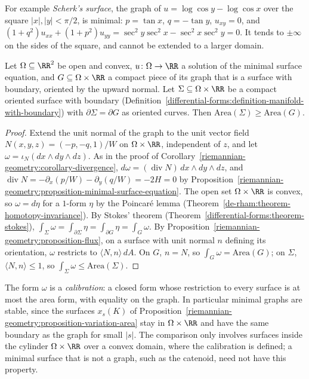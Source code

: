 For example \emph{Scherk's surface}, the graph of $u = \log\cos y - \log\cos x$ over the square $|x|, |y| < \pi/2$, is minimal: $p = \tan x$, $q = -\tan y$, $u_{xy} = 0$, and
$(1 + q^2)u_{xx} + (1 + p^2)u_{yy} = \sec^2y\sec^2x - \sec^2x\sec^2y = 0$. It tends to $\pm\infty$ on the sides of the square, and cannot be extended to a larger domain.

\begin{proposition}\label{riemannian-geometry:proposition-graphs-minimise}
Let $\Omega \subseteq \RR^2$ be open and convex, $u \colon \Omega \to \RR$ a solution of the minimal surface equation, and $G \subseteq \Omega \times \RR$ a compact piece of its
graph that is a surface with boundary, oriented by the upward normal. Let $\Sigma \subseteq \Omega \times \RR$ be a compact oriented surface with boundary
(Definition~\ref{differential-forms:definition-manifold-with-boundary}) with $\partial\Sigma = \partial G$ as oriented curves. Then $\mathrm{Area}(\Sigma) \geq \mathrm{Area}(G)$.
\end{proposition}

\begin{proof}
Extend the unit normal of the graph to the unit vector field $N(x, y, z) = (-p, -q, 1)/W$ on $\Omega \times \RR$, independent of $z$, and let
$\omega = \iota_N(dx \wedge dy \wedge dz)$. As in the proof of Corollary~\ref{riemannian-geometry:corollary-divergence},
$d\omega = (\operatorname{div}N)\,dx \wedge dy \wedge dz$, and $\operatorname{div}N = -\partial_x(p/W) - \partial_y(q/W) = -2H = 0$ by
Proposition~\ref{riemannian-geometry:proposition-minimal-surface-equation}. The open set $\Omega \times \RR$ is convex, so $\omega = d\eta$ for a $1$-form $\eta$ by the Poincar\'e lemma
(Theorem~\ref{de-rham:theorem-homotopy-invariance}). By Stokes' theorem (Theorem~\ref{differential-forms:theorem-stokes}),
$\int_\Sigma\omega = \int_{\partial\Sigma}\eta = \int_{\partial G}\eta = \int_G\omega$. By Proposition~\ref{riemannian-geometry:proposition-flux}, on a surface with unit normal $n$
defining its orientation, $\omega$ restricts to $\langle N, n\rangle\,dA$. On $G$, $n = N$, so $\int_G\omega = \mathrm{Area}(G)$; on $\Sigma$, $\langle N, n\rangle \leq 1$, so
$\int_\Sigma\omega \leq \mathrm{Area}(\Sigma)$.
\end{proof}

The form $\omega$ is a \emph{calibration}: a closed form whose restriction to every surface is at most the area form, with equality on the graph. In particular minimal graphs
are stable, since the surfaces $x_s(K)$ of Proposition~\ref{riemannian-geometry:proposition-variation-area} stay in $\Omega \times \RR$ and have the same boundary as the graph for
small $|s|$. The comparison only involves surfaces inside the cylinder $\Omega \times \RR$ over a convex domain, where the calibration is defined; a minimal surface
that is not a graph, such as the catenoid, need not have this property.

